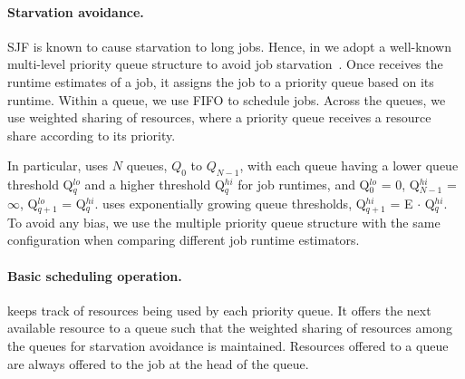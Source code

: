\paragraph{Starvation avoidance.}
SJF is known to cause starvation to long jobs. Hence, {in \gs we adopt
a well-known multi-level priority queue structure to avoid job 
starvation~\cite{feedback:jacm1968,raiLAS:sigmetrics2003,nuyens:survey2008,aalo:sigcomm15}}.  
%
Once \gs receives the runtime estimates of a job, it assigns the job
to a priority queue based on its runtime.  Within a queue, we use
FIFO to schedule jobs. Across the queues, we use weighted sharing of
resources, where a priority queue receives a resource share according
to its priority.

In particular, \gs uses $N$ queues, $Q_0$ to $Q_{N-1}$, with each queue having
a lower queue threshold Q$^{lo}_{q}$ and a higher threshold Q$^{hi}_{q}$ for
job runtimes, and Q$^{lo}_0$ = 0, Q$^{hi}_{N-1}$ = $\infty$, Q$^{lo}_{q+1}$ =
Q$^{hi}_{q}$. \gs uses exponentially growing queue thresholds, \ie
Q$^{hi}_{q+1}$ = E $\cdot$ Q$^{hi}_{q}$.
To avoid any bias, we use the multiple priority queue structure with the same
configuration when comparing different job runtime estimators.


{\paragraph{Basic scheduling operation.} \gs keeps track of
resources being used by each priority queue. It offers the next available resource
to a queue such that the weighted sharing of resources among the queues 
for starvation avoidance is maintained. Resources offered to a queue are
always offered to the job at the head of the queue.}

